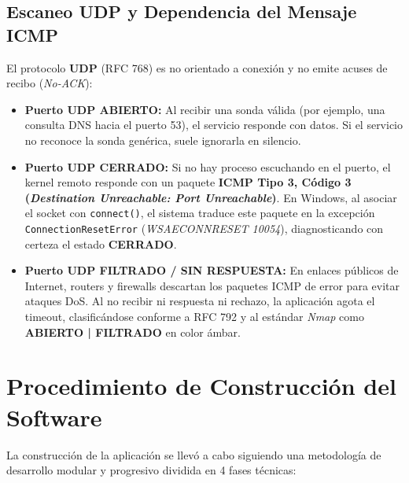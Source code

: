 \documentclass[10pt,a4paper]{article}
\newcommand{\UDP}{\textbf{UDP}}
\begin{document}
\subsection{Escaneo \UDP{} y Dependencia del Mensaje ICMP}
El protocolo \UDP{} (RFC 768) es no orientado a conexión y no emite acuses de recibo (\textit{No-ACK}):
\begin{itemize}[leftmargin=*,itemsep=1pt]
    \item \textbf{Puerto \UDP{} ABIERTO:} Al recibir una sonda válida (por ejemplo, una consulta DNS hacia el puerto 53), el servicio responde con datos. Si el servicio no reconoce la sonda genérica, suele ignorarla en silencio.
    \item \textbf{Puerto \UDP{} CERRADO:} Si no hay proceso escuchando en el puerto, el kernel remoto responde con un paquete \textbf{ICMP Tipo 3, Código 3 (\textit{Destination Unreachable: Port Unreachable})}. En Windows, al asociar el socket con \texttt{connect()}, el sistema traduce este paquete en la excepción \texttt{ConnectionResetError} (\textit{WSAECONNRESET 10054}), diagnosticando con certeza el estado \textbf{CERRADO}.
    \item \textbf{Puerto \UDP{} FILTRADO / SIN RESPUESTA:} En enlaces públicos de Internet, routers y firewalls descartan los paquetes ICMP de error para evitar ataques DoS. Al no recibir ni respuesta ni rechazo, la aplicación agota el timeout, clasificándose conforme a RFC 792 y al estándar \textit{Nmap} como \textbf{ABIERTO | FILTRADO} en color ámbar.
\end{itemize}

\section{Procedimiento de Construcción del Software}

La construcción de la aplicación se llevó a cabo siguiendo una metodología de desarrollo modular y progresivo dividida en 4 fases técnicas:
\end{document}
